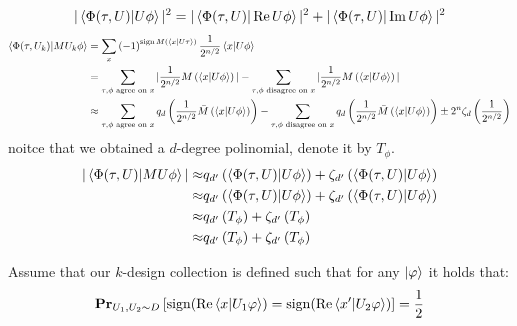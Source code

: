 \documentclass[manuscript,screen,review]{acmart}
\begin{document}
\begin{equation*}
  \begin{split}
    |\braket{\Phi(\tau,U)|U\phi}|^2 = | \braket{\Phi(\tau, U)|\Rea U\phi}|^2  + |\braket{\Phi(\tau,U)|\Ima U\phi}|^2 
  \end{split}
\end{equation*}
\begin{equation*}
  \begin{split}
    \braket{\Phi(\tau,U_{k})|MU_{k}\phi} & = \sum_{x}{ \left( -1 \right)^{\sign M\left( \braket{x|U\tau} \right) } \frac{1}{2^{n/2}} \braket{x|U\phi} }\\
    & = \sum_{ \tau,\phi \text{ agree on } x}{ | \frac{1}{2^{n/2}}M \left( \braket{x|U\phi} \right)| } - \sum_{ \tau,\phi \text{ disagree on } x}{  | \frac{1}{2^{n/2}}M \left( \braket{x|U\phi} \right)| }  \\
    & \approx \sum_{ \tau,\phi \text{ agree on } x}{ q_{d} \left(\frac{1}{2^{n/2}}\bar{M} \left( \braket{x|U\phi} \right) \right) } - \sum_{ \tau,\phi \text{ disagree on } x}{  q_{d}\left( \frac{1}{2^{n/2}}\bar{M} \left( \braket{x|U\phi} \right) \right) }  \pm 2^{n}\zeta_{d}\left(\frac{1}{2^{n/2}} \right) 
  \end{split}
\end{equation*}
noitce that we obtained a $d$-degree polinomial, denote it by $T_{\phi}$.
\begin{equation*}
  \begin{split}
    | \braket{\Phi(\tau,U)|MU\phi} |  \approx & q_{d^{\prime}}\left( \braket{\Phi(\tau,U)|U\phi} \right) + \zeta_{d^{\prime}}\left( \braket{\Phi(\tau,U)|U\phi} \right) \\
\approx & q_{d^{\prime}}\left( \braket{\Phi(\tau,U)|U\phi} \right) + \zeta_{d^{\prime}}\left( \braket{\Phi(\tau,U)|U\phi} \right)\\
\approx & q_{d^{\prime}}\left(  T_{\phi}\right) + \zeta_{d^{\prime}}\left( T_{\phi} \right)\\
\approx & q_{d^{\prime}}\left(  T_{\phi}\right) + \zeta_{d^{\prime}}\left( T_{\phi} \right)
  \end{split}
\end{equation*}

Assume that our $k$-design collection is defined such that for any $\ket{\varphi}$ it holds that: 
\begin{equation*}
  \begin{split}
    \prbm{  \sign(\Rea \braket{x|U_{1}\varphi} ) = \sign(\Rea \braket{x^{\prime}|U_{2}\varphi} )}{ U_{1},U_{2}\sim D } = \frac{1}{2}
  \end{split}
\end{equation*}
\end{document}
